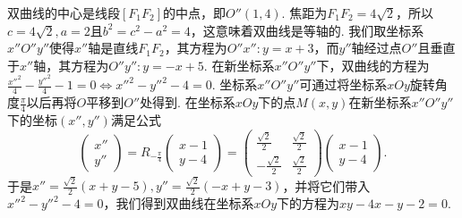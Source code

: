 \begin{solution}
  \begin{inparaenum}[(a)]
    \item 双曲线的中心是线段$[F_1F_2]$的中点，即$O''(1,4)$. 焦距为$F_1F_2=4\sqrt2$，所以$c=4\sqrt2,a=2$且$b^2=c^2-a^2=4$，这意味着双曲线是等轴的. 我们取坐标系$x''O''y''$使得$x''$轴是直线$F_1F_2$，其方程为$O''x'':y=x+3$，而$y''$轴经过点$O''$且垂直于$x''$轴，其方程为$O''y'':y=-x+5$. 在新坐标系$x''O''y''$下，双曲线的方程为$\frac{x''^2}4-\frac{y''^2}4-1=0
        \Leftrightarrow x''^2-y''^2-4=0$. 坐标系$x''O''y''$可通过将坐标系$xOy$旋转角度$\frac\pi4$以后再将$O$平移到$O''$处得到. 在坐标系$xOy$下的点$M(x,y)$在新坐标系$x''O''y''$下的坐标$(x'',y'')$满足公式
        \[
          \begin{pmatrix}
            x'' \\
            y''
          \end{pmatrix} =
          R_{-\frac\pi4}
          \begin{pmatrix}
            x - 1 \\
            y - 4
          \end{pmatrix} =
          \begin{pmatrix}
            \frac{\sqrt2}2 & \frac{\sqrt2}2 \\
            -\frac{\sqrt2}2 & \frac{\sqrt2}2
          \end{pmatrix}
          \begin{pmatrix}
            x - 1 \\
            y - 4
          \end{pmatrix}.
        \]
    于是$x''=\frac{\sqrt2}2(x+y-5),y''=\frac{\sqrt2}2(-x+y
    -3)$，并将它们带入$x''^2-y''^2-4=0$，我们得到双曲线在坐标系$xOy$下的方程为$xy-4x-y-2=0$.


\end{inparaenum}
\end{solution}
